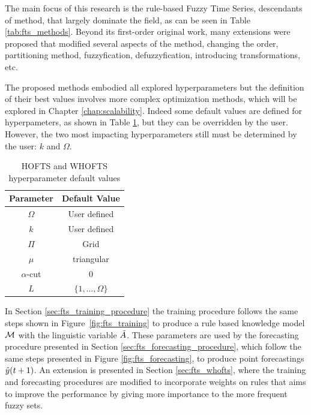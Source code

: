 The main focus of this research is the rule-based Fuzzy Time Series, descendants of \cite{chen1996forecasting} method, that  largely dominate the field, as can be seen in Table \ref{tab:fts_methods}. Beyond its first-order original work, many extensions were proposed that modified several aspects of the method, changing the order, partitioning method, fuzzyfication, defuzzyfication, introducing transformations, etc. 

The proposed methods embodied all explored hyperparameters but the definition of their best values involves more complex optimization methods, which will be explored in Chapter \ref{chap:scalability}. Indeed some default values are defined for hyperpameters, as shown in Table \ref{tab:hofts_hyperparam}, but they can be overridden by the user. However, the two most impacting hyperparameters still must be determined by the user: $k$ and $\Omega$.

\begin{table}[htb] 
    \centering
    \begin{tabular}{|c|c|} \hline
        \textbf{Parameter} & \textbf{Default Value}  \\ \hline
        $\Omega$ & User defined  \\ \hline
        $k$ & User defined  \\ \hline
        $\Pi$ & Grid \\ \hline
        $\mu$ & triangular  \\ \hline 
        $\alpha$-cut & 0 \\ \hline
        $L$ & $\{1,\ldots,\Omega\}$  \\ \hline
    \end{tabular}
    \caption{HOFTS and WHOFTS hyperparameter default values}
    \label{tab:hofts_hyperparam}
\end{table}

\index{$\model$}
In Section \ref{sec:fts_training_procedure} the training procedure follows the same steps shown in Figure~\ref{fig:fts_training} to produce a rule based knowledge model $\model$ with the linguistic variable $\tilde{A}$. These parameters are used by the forecasting procedure presented in Section \ref{sec:fts_forecasting_procedure}, which follow the same steps presented in Figure \ref{fig:fts_forecasting}, to produce point forecastings $\hat{y}(t+1)$. An extension is presented in Section \ref{sec:fts_whofts}, where the training and forecasting procedures are modified to incorporate weights on rules that aims to improve the performance by giving more importance to the more frequent fuzzy sets. 

